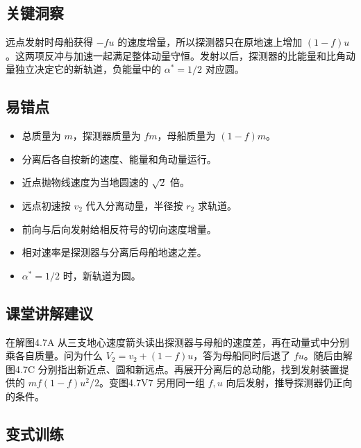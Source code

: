 \documentclass[UTF8,fontset=fandol,a4paper,11pt]{ctexart}
\begin{document}
\subsection*{关键洞察}

远点发射时母船获得 $-fu$ 的速度增量，所以探测器只在原地速上增加 $(1-f)u$。这两项反冲与加速一起满足整体动量守恒。发射以后，探测器的比能量和比角动量独立决定它的新轨道，负能量中的 $\alpha^*=1/2$ 对应圆。



\subsection*{易错点}

\begin{itemize}
\item 总质量为 $m$，探测器质量为 $fm$，母船质量为 $(1-f)m$。
\item 分离后各自按新的速度、能量和角动量运行。
\item 近点抛物线速度为当地圆速的 $\sqrt2$ 倍。
\item 远点初速按 $v_2$ 代入分离动量，半径按 $r_2$ 求轨道。
\item 前向与后向发射给相反符号的切向速度增量。
\item 相对速率是探测器与分离后母船地速之差。
\item $\alpha^*=1/2$ 时，新轨道为圆。
\end{itemize}



\subsection*{课堂讲解建议}

在解图4.7A 从三支地心速度箭头读出探测器与母船的速度差，再在动量式中分别乘各自质量。问为什么 $V_2=v_2+(1-f)u$，答为母船同时后退了 $fu$。随后由解图4.7C 分别指出新近点、圆和新远点。再展开分离后的总动能，找到发射装置提供的 $mf(1-f)u^2/2$。变图4.7V7 另用同一组 $f,u$ 向后发射，推导探测器仍正向的条件。



\subsection*{变式训练}
\end{document}
